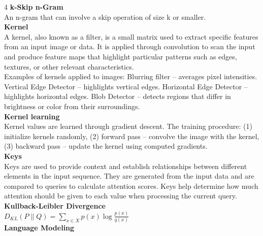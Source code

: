 \documentclass[8pt]{extarticle}
\begin{document}
\begin{multicols}{4}
\vspace{2pt}\textbf{k-Skip n-Gram}\\
An n-gram that can involve a skip operation of size k or smaller.\\
\vspace{2pt}\textbf{Kernel}\\
A kernel, also known as a filter, is a small matrix used to extract specific features from an input image or data. It is applied through convolution to scan the input and produce feature maps that highlight particular patterns such as edges, textures, or other relevant characteristics.\\
Examples of kernels applied to images: \textbullet{} Blurring filter -- averages pixel intensities. \textbullet{} Vertical Edge Detector -- highlights vertical edges. \textbullet{} Horizontal Edge Detector -- highlights horizontal edges. \textbullet{} Blob Detector -- detects regions that differ in brightness or color from their surroundings.\\
\vspace{2pt}\textbf{Kernel learning}\\
Kernel values are learned through gradient descent. The training procedure: (1) initialize kernels randomly, (2) forward pass -- convolve the image with the kernel, (3) backward pass -- update the kernel using computed gradients.\\
\vspace{2pt}\textbf{Keys}\\
Keys are used to provide context and establish relationships between different elements in the input sequence. They are generated from the input data and are compared to queries to calculate attention scores. Keys help determine how much attention should be given to each value when processing the current query.\\
\vspace{2pt}\textbf{Kullback-Leibler Divergence}\\
$D_{KL}(P\|Q) = \sum_{x \in X} p(x) \log \frac{p(x)}{q(x)}$\\
\vspace{2pt}\textbf{Language Modeling}\\


\end{multicols}
\end{document}
